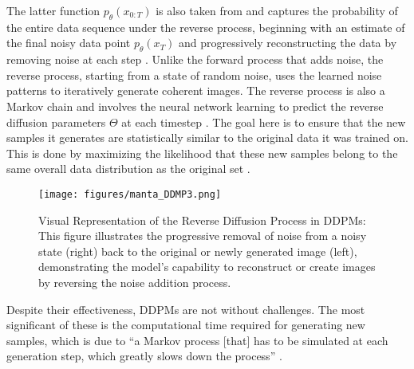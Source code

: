 The latter function \(p_\theta(x_{0:T})\) is also taken from \citeauthor{martinez2023understanding} and captures the probability of the entire data sequence under the reverse process, beginning with an estimate of the final noisy data point \(p_\theta(x_{T})\) and progressively reconstructing the data by removing noise at each step \citep{hoDDPMs,martinez2023understanding}. Unlike the forward process that adds noise, the reverse process, starting from a state of random noise, uses the learned noise patterns to iteratively generate coherent images. The reverse process is also a Markov chain and involves the neural network learning to predict the reverse diffusion parameters \(\Theta\) at each timestep \citep{yangdiffusionSummary}. The goal here is to ensure that the new samples it generates are statistically similar to the original data it was trained on. This is done by maximizing the likelihood that these new samples belong to the same overall data distribution as the original set \citep{yangdiffusionSummary}.

\begin{figure}[ht]
  \centering
    \texttt{[image: figures/manta\_DDMP3.png]}
    \caption{Visual Representation of the Reverse Diffusion Process in DDPMs: This figure illustrates the progressive removal of noise from a noisy state (right) back to the original or newly generated image (left), demonstrating the model's capability to reconstruct or create images by reversing the noise addition process.}\label{fig:figureReverseProcess}
\end{figure}

\begin{comment}
[
In the reverse process, the neural network can be trained to predict one of three possibilities: the mean of the noise at each time step, the original image itself, or the noise of the image \citep{hoDDPMs}. The second approach is not as advantageous as the ``estimating small perturbations is easier than explicitly describing the entire distribution with a single, non-analytically normalizable potential function'' \citep{sohlDDPM}. Focusing on the prediction of image noise is preferable because it allows a simple subtraction of the noise from the image, resulting in a less noisy version and thus also allowing an iterative generation of an image from the noise.
]
\end{comment}

Despite their effectiveness, DDPMs are not without challenges. The most significant of these is the computational time required for generating new samples, which is due to ``a Markov process [that] has to be simulated at each generation step, which greatly slows down the process'' \citep{martinez2023understanding}.